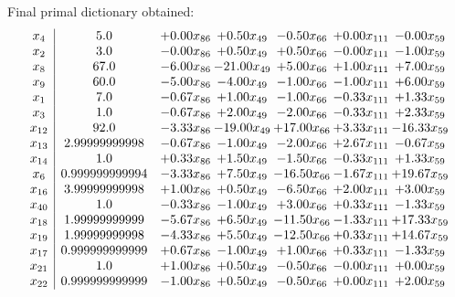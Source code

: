 \documentclass[8pt]{article}
\begin{document}
 Final primal dictionary obtained: 
\[\begin{array}{c| c c@{\hskip 2pt} c@{\hskip 2pt} c@{\hskip 2pt} c@{\hskip 2pt} c@{\hskip 2pt} }
 x_{4}   &  5.0 & +  0.00 x_{86} & +  0.50 x_{49} & -0.50 x_{66} & +  0.00 x_{111} & -0.00 x_{59}\\
 x_{2}   &  3.0 & -0.00 x_{86} & +  0.50 x_{49} & +  0.50 x_{66} & -0.00 x_{111} & -1.00 x_{59}\\
 x_{8}   &  67.0 & -6.00 x_{86} & -21.00 x_{49} & +  5.00 x_{66} & +  1.00 x_{111} & +  7.00 x_{59}\\
 x_{9}   &  60.0 & -5.00 x_{86} & -4.00 x_{49} & -1.00 x_{66} & -1.00 x_{111} & +  6.00 x_{59}\\
 x_{1}   &  7.0 & -0.67 x_{86} & +  1.00 x_{49} & -1.00 x_{66} & -0.33 x_{111} & +  1.33 x_{59}\\
 x_{3}   &  1.0 & -0.67 x_{86} & +  2.00 x_{49} & -2.00 x_{66} & -0.33 x_{111} & +  2.33 x_{59}\\
 x_{12}   &  92.0 & -3.33 x_{86} & -19.00 x_{49} & + 17.00 x_{66} & +  3.33 x_{111} & -16.33 x_{59}\\
 x_{13}   &  2.99999999998 & -0.67 x_{86} & -1.00 x_{49} & -2.00 x_{66} & +  2.67 x_{111} & -0.67 x_{59}\\
 x_{14}   &  1.0 & +  0.33 x_{86} & +  1.50 x_{49} & -1.50 x_{66} & -0.33 x_{111} & +  1.33 x_{59}\\
 x_{6}   &  0.999999999994 & -3.33 x_{86} & +  7.50 x_{49} & -16.50 x_{66} & -1.67 x_{111} & + 19.67 x_{59}\\
 x_{16}   &  3.99999999998 & +  1.00 x_{86} & +  0.50 x_{49} & -6.50 x_{66} & +  2.00 x_{111} & +  3.00 x_{59}\\
 x_{40}   &  1.0 & -0.33 x_{86} & -1.00 x_{49} & +  3.00 x_{66} & +  0.33 x_{111} & -1.33 x_{59}\\
 x_{18}   &  1.99999999999 & -5.67 x_{86} & +  6.50 x_{49} & -11.50 x_{66} & -1.33 x_{111} & + 17.33 x_{59}\\
 x_{19}   &  1.99999999998 & -4.33 x_{86} & +  5.50 x_{49} & -12.50 x_{66} & +  0.33 x_{111} & + 14.67 x_{59}\\
 x_{17}   &  0.999999999999 & +  0.67 x_{86} & -1.00 x_{49} & +  1.00 x_{66} & +  0.33 x_{111} & -1.33 x_{59}\\
 x_{21}   &  1.0 & +  1.00 x_{86} & +  0.50 x_{49} & -0.50 x_{66} & -0.00 x_{111} & +  0.00 x_{59}\\
 x_{22}   &  0.999999999999 & -1.00 x_{86} & +  0.50 x_{49} & -0.50 x_{66} & +  0.00 x_{111} & +  2.00 x_{59}\\

\end{array}\]
\end{document}
